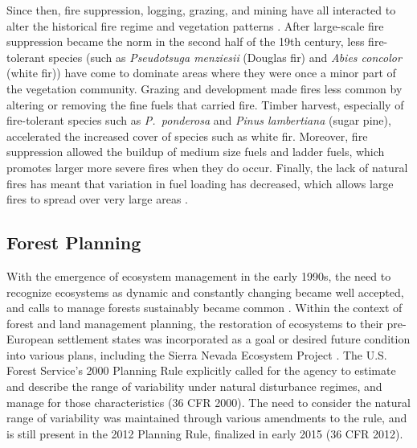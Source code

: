 Since then, fire suppression, logging, grazing, and mining have all interacted to alter the historical fire regime and vegetation patterns \citep{Stephens2015,Knapp2013}. After large-scale fire suppression became the norm in the second half of the 19th century, less fire-tolerant species (such as \emph{Pseudotsuga menziesii} (Douglas fir) and \emph{Abies concolor} (white fir)) have come to dominate areas where they were once a minor part of the vegetation community. Grazing and development made fires less common by altering or removing the fine fuels that carried fire. Timber harvest, especially of fire-tolerant species such as \emph{P.~ponderosa} and \emph{Pinus lambertiana} (sugar pine), accelerated the increased cover of species such as white fir. Moreover, fire suppression allowed the buildup of medium size fuels and ladder fuels, which promotes larger more severe fires when they do occur. Finally, the lack of natural fires has meant that variation in fuel loading has decreased, which allows large fires to spread over very large areas \citep{Hessburg2005,Beaty2007,Meyer2008}.



\subsection{Forest Planning}
With the emergence of ecosystem management in the early 1990s, the need to recognize ecosystems as dynamic and constantly changing became well accepted, and calls to manage forests sustainably became common \citep{Christensen1996}. Within the context of forest and land management planning, the restoration of ecosystems to their pre-European settlement states was incorporated as a goal or desired future condition into various plans, including the Sierra Nevada Ecosystem Project \citep{SNEP1996a}. The U.S. Forest Service's 2000 Planning Rule explicitly called for the agency to estimate and describe the range of variability under natural disturbance regimes, and manage for those characteristics (36 CFR  2000). The need to consider the natural range of variability was maintained through various amendments to the rule, and is still present in the 2012 Planning Rule, finalized in early 2015 (36 CFR  2012).



